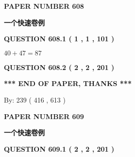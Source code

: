 \documentclass{ctexart}
\begin{document}
   
 {\textbf{ \Large{ PAPER NUMBER  608  }}}
   
   
\vspace{0.2in}
   
   
   
   
   
   
 \vspace{0.2in}
{\LARGE {\textbf{ 一个快速卷例}}}
   
   
  
\vspace{0.2in}
  
{\textbf{\Large{QUESTION
608.1 
 ( 1 , 1 , 101 )
}}}
  
  
 
 

$ %
40 +  %
47=   %
87$
 
 
  
\vspace{0.2in}
  
{\textbf{\Large{QUESTION
608.2 
 ( 2 , 2 , 201 )
}}}
  
  
   
   
 \vspace{0.2in}
 
   
   
   
   
\vspace{1.0in} 
{\textbf{\large{ *** END OF PAPER, THANKS *** }}} 
   
   
\hspace{1.0in} By: 
 239 ( 416 ,  613 )
   
   
   
   
\newpage 
\setcounter{page}{ 
   609001 } 
   
   
   
   
 {\textbf{ \Large{ PAPER NUMBER  609  }}}
   
   
\vspace{0.2in}
   
   
   
   
   
   
 \vspace{0.2in}
{\LARGE {\textbf{ 一个快速卷例}}}
   
   
  
\vspace{0.2in}
  
{\textbf{\Large{QUESTION
609.1 
 ( 2 , 2 , 201 )
}}}
  
\end{document}
